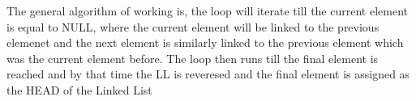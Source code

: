 \documentclass[11pt]{article}
\theoremstyle{definition}
\begin{document}
The general algorithm of working is, the loop will iterate till the current element is equal to NULL, where the current element
will be linked to the previous elemenet and the next element is similarly linked to the previous element which was the current element before.
The loop then runs till the final element is reached and by that time the LL is reveresed and the final element is assigned as the HEAD of the Linked List
 
\end{document}
